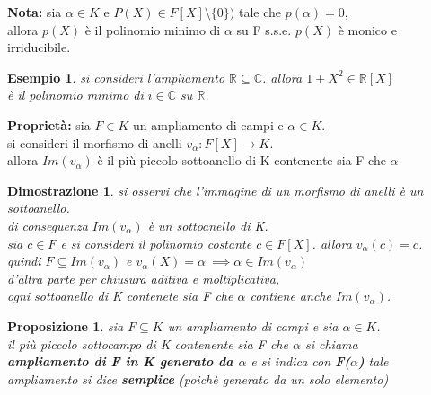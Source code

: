 \documentclass[a4paper,12pt]{article}
\theoremstyle{def}
\theoremstyle{prop}
\newtheorem*{proposition}{Proposizione}
\theoremstyle{esempio}
\newtheorem*{example}{Esempio}
\theoremstyle{dimostrazione}
\newtheorem*{dimostrazione}{Dimostrazione}
\theoremstyle{teo}
\theoremstyle{osservazione}
\begin{document}
\textbf{Nota:} sia \(\alpha \in K\) e \(P(X) \in F[X] \setminus \{0\})\) tale che \(p(\alpha) = 0\),\\
allora \(p(X)\) è il polinomio minimo di \(\alpha\) su F s.s.e. \(p(X)\) è monico e irriducibile.\\

\begin{example}
    si consideri l'ampliamento \(\mathbb{R} \subseteq \mathbb{C}\). allora \(1 + X^2 \in \mathbb{R}[X]\)\\
    è il polinomio minimo di \(i \in \mathbb{C}\) su \(\mathbb{R}\).
\end{example}

\newpage

\textbf{Proprietà:} sia \(F \in K\) un ampliamento di campi e \(\alpha \in K\).\\
si consideri il morfismo di anelli \(v_\alpha: F[X] \rightarrow K\).\\
allora \(Im(v_\alpha)\) è il più piccolo sottoanello di K contenente sia F che \(\alpha\)

\begin{dimostrazione}
    si osservi che l'immagine di un morfismo di anelli è un sottoanello.\\
    di conseguenza \(Im(v_\alpha)\) è un sottoanello di K.\\
    sia \(c \in F\) e si consideri il polinomio costante \(c \in F[X]\). allora \(v_\alpha(c)=c\).\\
    quindi \(F \subseteq Im(v_\alpha)\) e \(v_\alpha(X) = \alpha\ \implies \alpha \in Im(v_\alpha)\)\\
    d'altra parte per chiusura aditiva e moltiplicativa,\\
    ogni sottoanello di K contenete sia F che \(\alpha\) contiene anche \(Im(v_\alpha)\).
\end{dimostrazione}

\begin{proposition}
    sia \(F \subseteq K\) un ampliamento di campi e sia \(\alpha \in K\).\\
    il più piccolo sottocampo di K contenente sia F che \(\alpha\) si chiama\\
    \textbf{ampliamento di F in K generato da \(\alpha\)} e si indica con \textbf{F(\(\alpha\))}
    tale ampliamento si dice \textbf{semplice} (poichè generato da un solo elemento)
\end{proposition}

\vspace{\baselineskip}
\end{document}
